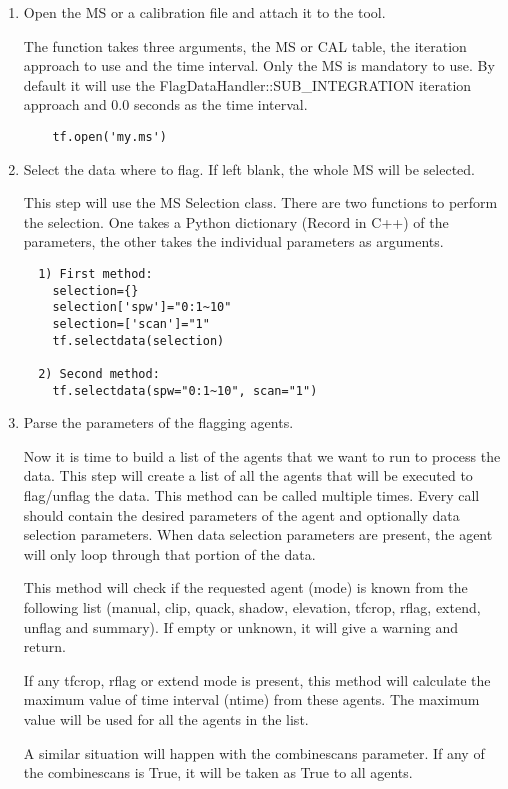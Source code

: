 \begin{enumerate}
\item Open the MS or a calibration file and attach it to the tool.

The function
takes three arguments, the MS or CAL table, the iteration approach to use and the time interval. 
Only the MS is mandatory to use. By default it will use the
FlagDataHandler::SUB\_INTEGRATION iteration approach and 0.0 seconds as the
time interval.

\begin{verbatim}
    tf.open('my.ms')
\end{verbatim}

\item Select the data where to flag. If left blank, the whole MS will be
selected.

This step will use the MS Selection class. There are two functions to perform the
selection. One takes a Python dictionary (Record in C++) of the parameters, the
other takes the individual parameters as arguments.

\begin{verbatim}
  1) First method:
    selection={}
    selection['spw']="0:1~10"
    selection=['scan']="1"
    tf.selectdata(selection)

  2) Second method:
    tf.selectdata(spw="0:1~10", scan="1")
\end{verbatim}

\item Parse the parameters of the flagging agents.

Now it is time to build a list of the agents that we want to run to process the data. This
step will create a list of all the agents that will be executed to flag/unflag the data.
This method can be called multiple times. Every call should contain the desired parameters of
the agent and optionally data selection parameters. When data selection parameters are present,
the agent will only loop through that portion of the data.

This method will check if the requested agent (mode) is known from the following list
(manual, clip, quack, shadow, elevation, tfcrop, rflag, extend, unflag and summary). If
empty or unknown, it will give a warning and return.

If any tfcrop, rflag or extend mode is present, this method will calculate the maximum value
of time interval (ntime) from these agents. The maximum value will be used for
all the agents in the list.

A similar situation will happen with the combinescans parameter. If any of the combinescans is
True, it will be taken as True to all agents.


\end{enumerate}
